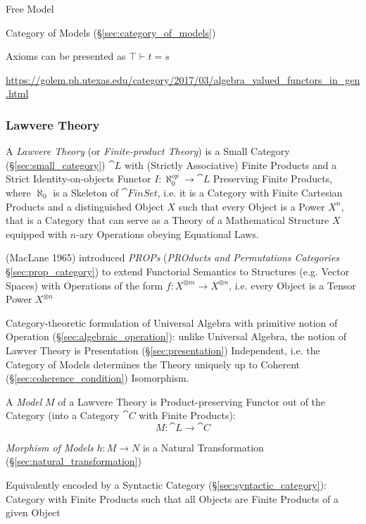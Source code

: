 Free Model

Category of Models (\S\ref{sec:category_of_models})

Axioms can be presented as $\top \vdash t = s$


\url{https://golem.ph.utexas.edu/category/2017/03/algebra_valued_functors_in_gen.html}



\subsubsection{Lawvere Theory}\label{sec:lawvere_theory}

A \emph{Lawvere Theory} (or \emph{Finite-product Theory}) is a Small Category
(\S\ref{sec:small_category}) $\cat{L}$ with (Strictly Associative) Finite
Products and a Strict Identity-on-objects Functor $I : \aleph_0^{op}
\rightarrow \cat{L}$ Preserving Finite Products, where $\aleph_0$ is a Skeleton
of $\cat{FinSet}$, i.e. it is a Category with Finite Cartesian Products and a
distinguished Object $X$ such that every Object is a Power $X^n$, that is a
Category that can serve as a Theory of a Mathematical Structure $X$ equipped
with $n$-ary Operations obeying Equational Laws.

\fist (MacLane 1965) introduced \emph{PROPs} (\emph{PROducts and Permutations
  Categories} \S\ref{sec:prop_category}) to extend Functorial Semantics to
Structures (e.g. Vector Spaces) with Operations of the form $f : X^{\otimes m}
\rightarrow X^{\otimes n}$, i.e. every Object is a Tensor Power $X^{\otimes n}$

Category-theoretic formulation of Universal Algebra with primitive notion of
Operation (\S\ref{sec:algebraic_operation}): unlike Universal Algebra, the
notion of Lawver Theory is Presentation (\S\ref{sec:presentation}) Independent,
i.e. the Category of Models determines the Theory uniquely up to Coherent
(\S\ref{sec:coherence_condition}) Isomorphism. \cite{hyland-power06}

A \emph{Model} $M$ of a Lawvere Theory is Product-preserving Functor
out of the Category (into a Category $\cat{C}$ with Finite Products):
\[
  M : \cat{L} \rightarrow \cat{C}
\]

\emph{Morphism of Models} $h : M \rightarrow N$ is a Natural
Transformation (\S\ref{sec:natural_transformation})

Equivalently encoded by a Syntactic Category
(\S\ref{sec:syntactic_category}): Category with Finite Products such
that all Objects are Finite Products of a given Object

